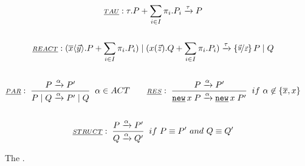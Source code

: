 \begin{figure}[h!]
\begin{gather*}
\underline{\scriptstyle{TAU}}: \procchoice{\tau.P}{\procsum} \transs{\tau} P\\\\
\underline{\scriptstyle{REACT}}: \procpar{(\procchoice{\out{x}{\vec{y}}.P}{\procsum})}{(\procchoice{\inp{x}{\vec{z}}.Q}{\procsum})} \transs{\tau} \subs{\vec{y}}{\vec{z}}\procpar{P}{Q}\\\\
\kalRule[\alpha \in ACT]{PAR}{}{P \transs{\alpha} P'}{\procpar{P}{Q} \transs{\alpha} \procpar{P'}{Q}} \quad\quad \kalRule[if\ \alpha \nin \{\overline{x},x\}]{RES}{}{P \transs{\alpha} P'}{\procres{x}{P} \transs{\alpha} \procres{x}{P'}}\\\\
 \kalRule[if \ \struct{P}{P'} \ and\ \struct{Q}{Q'}]{STRUCT}{}{P \transs{\alpha} P'}{Q \transs{\alpha} Q'}
\end{gather*}
\caption{The  \cite{sangiorgi}.}
\label{fig_ts_early}
\end{figure}

